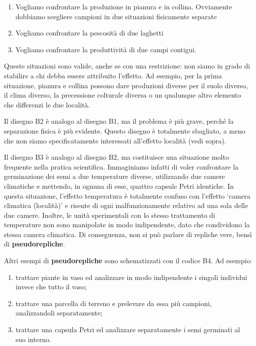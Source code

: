 \documentclass[a4paper,12pt,oneside]{book}
\providecommand{\tightlist}{%
  \setlength{\itemsep}{0pt}\setlength{\parskip}{0pt}}
\begin{document}
\begin{enumerate}
\def\labelenumi{\arabic{enumi}.}
\tightlist
\item
  Vogliamo confrontare la produzione in pianura e in collina. Ovviamente
  dobbiamo scegliere campioni in due situazioni fisicamente separate
\item
  Vogliamo confrontare la pescosità di due laghetti
\item
  Vogliamo confrontare la produttività di due campi contigui.
\end{enumerate}

Queste situazioni sono valide, anche se con una restrizione: non siamo
in grado di stabilire a chi debba essere attribuito l'effetto. Ad
esempio, per la prima situazione, pianura e collina possono dare
produzioni diverse per il suolo diverso, il clima diverso, la
precessione colturale diversa o un qualunque altro elemento che
differenzi le due località.

Il disegno B2 è analogo al disegno B1, ma il problema è più grave,
perché la separazione fisica è più evidente. Questo disegno è totalmente
sbagliato, a meno che non siamo specificatamente interessati all'effetto
località (vedi sopra).

Il disegno B3 è analogo al disegno B2, ma costituisce una situazione
molto frequente nella pratica scientifica. Immaginiamo infatti di voler
confrontare la germinazione dei semi a due temperature diverse,
utilizzando due camere climatiche e mettendo, in ognuna di esse, quattro
capsule Petri identiche. In questa situazione, l'effetto temperatura è
totalmente confuso con l'effetto `camera climatica (località)' e risente
di ogni malfunzionamente relativo ad una sola delle due camere. Inoltre,
le unità sperimentali con lo stesso trattamento di temperature non sono
manipolate in modo indipendente, dato che condividono la stessa camera
climatica. Di conseguenza, non si può parlare di repliche vere, bensì di
\textbf{pseudorepliche}.

Altri esempi di \textbf{pseudorepliche} sono schematizzati con il codice
B4. Ad esempio:

\begin{enumerate}
\def\labelenumi{\arabic{enumi}.}
\tightlist
\item
  trattare piante in vaso ed analizzare in modo indipendente i singoli
  individui invece che tutto il vaso;
\item
  trattare una parcella di terreno e prelevare da essa più campioni,
  analizzandoli separatamente;
\item
  trattare una capsula Petri ed analizzare separatamente i semi
  germinati al suo interno.
\end{enumerate}
\end{document}
